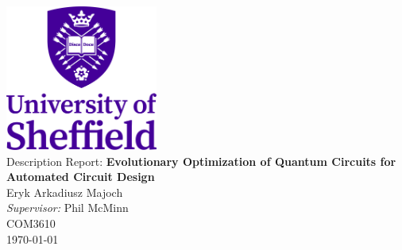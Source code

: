 \documentclass[11pt,oneside]{book}
\begin{document}
\frontmatter

\begin{titlepage}
    \begin{center}
        \includegraphics[width=5cm]{images/UOSLogo_Portrait_Violet_RGB.png}\\[2cm]
        \linespread{1.2}\huge Description Report: {\bfseries Evolutionary Optimization of Quantum Circuits for Automated Circuit Design}\\[2cm]
        \linespread{1}
        {\Large Eryk Arkadiusz Majoch}\\[1cm]
        {\large \emph{Supervisor:} Phil McMinn}\\[1cm]
        \large COM3610 \\
        \today
    \end{center}
\end{titlepage}

\newpage
\tableofcontents


\mainmatter




\printbibliography[notkeyword=lit]
\end{document}
